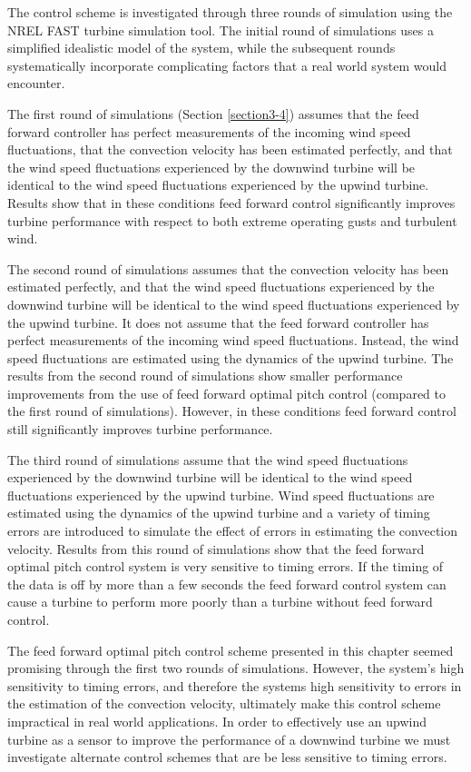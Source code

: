The control scheme is investigated through three rounds of simulation using the NREL FAST turbine simulation tool. The initial round of simulations uses a simplified idealistic model of the system, while the subsequent rounds systematically incorporate complicating factors that a real world system would encounter.  

The first round of simulations (Section \ref{section3-4}) assumes that the feed forward controller has perfect measurements of the incoming wind speed fluctuations, that the convection velocity has been estimated perfectly, and that the wind speed fluctuations experienced by the downwind turbine will be identical to the wind speed fluctuations experienced by the upwind turbine. Results show that in these conditions feed forward control significantly improves turbine performance with respect to both extreme operating gusts and turbulent wind.

The second round of simulations assumes that the convection velocity has been estimated perfectly, and that the wind speed fluctuations experienced by the downwind turbine will be identical to the wind speed fluctuations experienced by the upwind turbine. It does not assume that the feed forward controller has perfect measurements of the incoming wind speed fluctuations. Instead, the wind speed fluctuations are estimated using the dynamics of the upwind turbine. The results from the second round of simulations show smaller performance improvements from the use of feed forward optimal pitch control (compared to the first round of simulations). However, in these conditions feed forward control still significantly improves turbine performance.

The third round of simulations assume that the wind speed fluctuations experienced by the downwind turbine will be identical to the wind speed fluctuations experienced by the upwind turbine. Wind speed fluctuations are estimated using the dynamics of the upwind turbine and a variety of timing errors are introduced to simulate the effect of errors in estimating the convection velocity. Results from this round of simulations show that the feed forward optimal pitch control system is very sensitive to timing errors. If the timing of the data is off by more than a few seconds the feed forward control system can cause a turbine to perform more poorly than a turbine without feed forward control.

The feed forward optimal pitch control scheme presented in this chapter seemed promising through the first two rounds of simulations. However, the system's high sensitivity to timing errors, and therefore the systems high sensitivity to errors in the estimation of the convection velocity, ultimately make this control scheme impractical in real world applications. In order to effectively use an upwind turbine as a sensor to improve the performance of a downwind turbine we must investigate alternate control schemes that are be less sensitive to timing errors.
